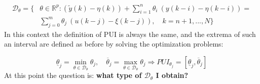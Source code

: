 \begin{equation}\label{eq:FPS}
    \begin{aligned}
        \mathcal{D}_\theta = \{
            &\theta\in\mathbb{R}^p:  
            (\tilde{y}(k)-\eta(k))+\sum_{i=1}^n{\theta_i}\ ({y}(k-i)-\eta(k-i))=\\
            &\sum_{j=0}^m \theta_j \ (u(k-j)-\xi(k-j)), \quad
            k=n+1,...,N
        \} 
    \end{aligned}
\end{equation}
\noindent
In this context the definition of PUI is always the same, and the extrema of such an interval are defined as before by  solving the optimization problems:

\begin{equation*}
    \underline{\theta}_j = \min_{\theta\in\mathcal{D}_\theta} \theta_j, \quad 
    \overline{\theta}_j = \max_{\theta\in\mathcal{D}_\theta} \theta_j
    \Longrightarrow PUI_{\theta_j}=[\underline{\theta}_j,\overline{\theta}_j]
\end{equation*}
At this point the question is: \textbf{what type of $\mathcal{D}_\theta$ I obtain?} 
